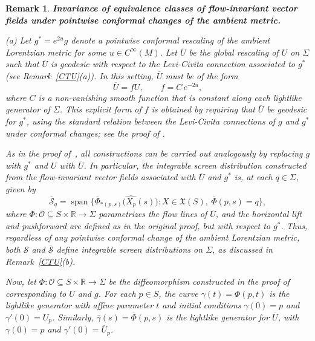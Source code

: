 \documentclass[11pt]{article}
\numberwithin{equation}{section}
\newtheorem{remark}[theorem]{Remark}
\begin{document}
		\begin{remark}\label{remark:reparametrize}
		\textbf{Invariance of equivalence classes of flow-invariant vector fields under pointwise conformal changes of the ambient metric.} \normalfont
		
	(a) Let $g^* = e^{2u}g$ denote a pointwise conformal rescaling of the ambient Lorentzian metric for some $u \in C^\infty(M)$. 
	Let $\overline{U}$ be the global rescaling of $U$ on $\Sigma$ such that $\overline{U}$ is geodesic with respect to the Levi-Civita connection associated to $g^*$ (see Remark~\ref{CTU}(a)). %
	In this setting, $\overline{U}$ must be of the form
	\[
	\overline{U} = f U, \qquad f = C\,e^{-2u},
	\]
	where $C$ is a non-vanishing smooth function that is constant along each lightlike generator of $\Sigma$. 
	This explicit form of $f$ is obtained by requiring that $\overline{U}$ be geodesic for $g^*$, using the standard relation between the Levi-Civita connections of $g$ and $g^*$ under conformal changes; see the proof of .
	
	As in the proof of~, all constructions can be carried out analogously by replacing $g$ with $g^*$ and $U$ with $\overline{U}$. In particular, the integrable screen distribution constructed from the flow-invariant vector fields associated with $\overline{U}$ and $g^*$ is, at each $q \in \Sigma$, given by 
	\[
	\overline{\mathcal{S}}_q = \operatorname{span}\bigl\{ \overline{\Phi}_{*(p, s)}\bigl(\widehat{X_p}(s)\bigr) : X \in \mathfrak{X}(S),\ \overline{\Phi}(p, s) = q \bigr\},
	\]
	where $\overline{\Phi}\colon \overline{\mathscr{O}} \subseteq S \times \mathbb{R} \to \Sigma$ parametrizes the flow lines of $\overline{U}$, and the horizontal lift and pushforward are defined as in the original proof, but with respect to $g^*$.
	Thus, regardless of any pointwise conformal change of the ambient Lorentzian metric, both $\mathcal{S}$ and $\overline{\mathcal{S}}$ define integrable screen distributions on $\Sigma$, as discussed in Remark~\ref{CTU}(b).
	
	Now, let $\Phi\colon \mathscr{O} \subseteq S \times \mathbb{R} \to \Sigma$ be the diffeomorphism constructed in the proof of~ corresponding to $U$ and $g$. 
	For each $p \in S$, the curve $\gamma(t) = \Phi(p, t)$ is the lightlike generator with affine parameter $t$ and initial conditions $\gamma(0) = p$ and $\gamma'(0) = U_p$. 
	Similarly, $\overline{\gamma}(s) = \overline{\Phi}(p, s)$ is the lightlike generator for $\overline{U}$, with $\overline{\gamma}(0) = p$ and $\overline{\gamma}'(0) = \overline{U}_p$. 
	

\end{remark}
\end{document}
